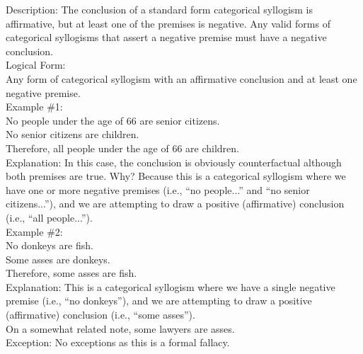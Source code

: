 \documentclass[a4paper,12pt,single,pdftex]{scrbook}
\begin{document}
    
      Description: The conclusion of a standard form categorical syllogism is affirmative, but at least one of the premises is negative. Any valid forms of categorical syllogisms that assert a negative premise must have a negative conclusion.
    \\

    
      Logical Form:
    \\

    
      Any form of categorical syllogism with an affirmative conclusion and at least one negative premise.
    \\

    
      Example \#1:
    \\

    
      No people under the age of 66 are senior citizens.
    \\

    
      No senior citizens are children.
    \\

    
      Therefore, all people under the age of 66 are children.
    \\

    
      Explanation: In this case, the conclusion is obviously counterfactual although both premises are true.  Why?  Because this is a categorical syllogism where we have one or more negative premises (i.e., “no people...” and “no senior citizens...”), and we are attempting to draw a positive (affirmative) conclusion (i.e., “all people...”). 
    \\

    
      Example \#2:
    \\

    
      No donkeys are fish.
    \\

    
      Some asses are donkeys.
    \\

    
      Therefore, some asses are fish.
    \\

    
      Explanation: This is a categorical syllogism where we have a single negative premise (i.e., “no donkeys”), and we are attempting to draw a positive (affirmative) conclusion (i.e., “some asses”).
    \\

    
      On a somewhat related note, some lawyers are asses.
    \\

    
      Exception: No exceptions as this is a formal fallacy.
    \\
\end{document}
